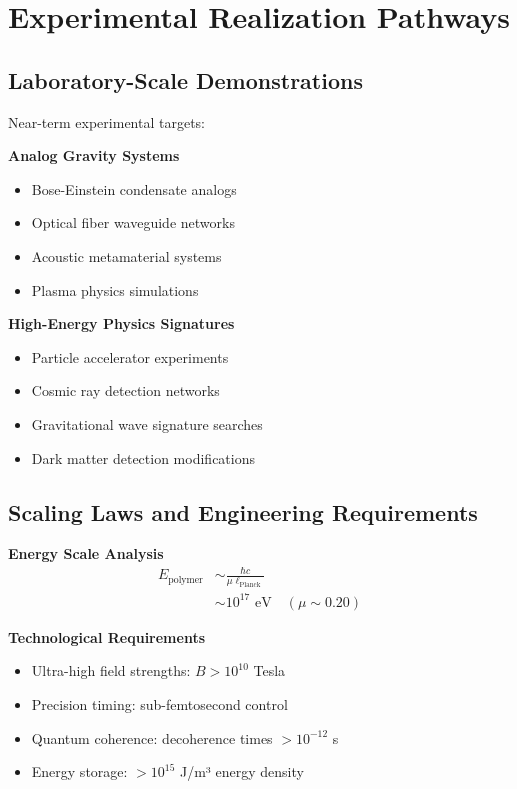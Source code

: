 \documentclass[11pt]{article}
\begin{document}
\section{Experimental Realization Pathways}

\subsection{Laboratory-Scale Demonstrations}

Near-term experimental targets:

\textbf{Analog Gravity Systems}
\begin{itemize}
\item Bose-Einstein condensate analogs
\item Optical fiber waveguide networks
\item Acoustic metamaterial systems
\item Plasma physics simulations
\end{itemize}

\textbf{High-Energy Physics Signatures}
\begin{itemize}
\item Particle accelerator experiments
\item Cosmic ray detection networks
\item Gravitational wave signature searches
\item Dark matter detection modifications
\end{itemize}

\subsection{Scaling Laws and Engineering Requirements}

\textbf{Energy Scale Analysis}
\begin{align}
E_{\text{polymer}} &\sim \frac{\hbar c}{\mu \ell_{\text{Planck}}} \\
&\sim 10^{17} \text{ eV} \quad (\mu \sim 0.20)
\end{align}

\textbf{Technological Requirements}
\begin{itemize}
\item Ultra-high field strengths: $B > 10^{10}$ Tesla
\item Precision timing: sub-femtosecond control
\item Quantum coherence: decoherence times $> 10^{-12}$ s
\item Energy storage: $> 10^{15}$ J/m³ energy density
\end{itemize}
\end{document}
